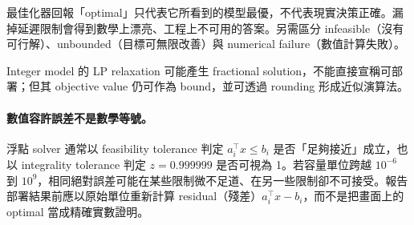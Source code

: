 \documentclass[11pt,a4paper,oneside,openany]{book}
\begin{document}
\begin{misconception}
最佳化器回報「optimal」只代表它所看到的模型最優，不代表現實決策正確。漏掉延遲限制會得到數學上漂亮、工程上不可用的答案。另需區分 infeasible（沒有可行解）、unbounded（目標可無限改善）與 numerical failure（數值計算失敗）。
\end{misconception}
Integer model 的 LP relaxation 可能產生 fractional solution，不能直接宣稱可部署；但其 objective value 仍可作為 bound，並可透過 rounding 形成近似演算法。

\paragraph{數值容許誤差不是數學等號。}
浮點 solver 通常以 feasibility tolerance 判定 $a_i^\top x\le b_i$ 是否「足夠接近」成立，也以 integrality tolerance 判定 $z=0.999999$ 是否可視為 1。若容量單位跨越 $10^{-6}$ 到 $10^9$，相同絕對誤差可能在某些限制微不足道、在另一些限制卻不可接受。報告部署結果前應以原始單位重新計算 residual（殘差）$a_i^\top x-b_i$，而不是把畫面上的 optimal 當成精確實數證明。
\end{document}
